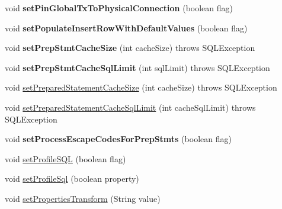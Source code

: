 \begin{DoxyCompactItemize}
void {\bfseries set\+Pin\+Global\+Tx\+To\+Physical\+Connection} (boolean flag)
\item 
\mbox{\label{classcom_1_1mysql_1_1jdbc_1_1jdbc2_1_1optional_1_1_connection_wrapper_abc9c76cd24f2cba013932390ad87d050}} 
void {\bfseries set\+Populate\+Insert\+Row\+With\+Default\+Values} (boolean flag)
\item 
\mbox{\label{classcom_1_1mysql_1_1jdbc_1_1jdbc2_1_1optional_1_1_connection_wrapper_aea615dcb590f8d76fca564b55a1f6409}} 
void {\bfseries set\+Prep\+Stmt\+Cache\+Size} (int cache\+Size)  throws S\+Q\+L\+Exception 
\item 
\mbox{\label{classcom_1_1mysql_1_1jdbc_1_1jdbc2_1_1optional_1_1_connection_wrapper_a28d309f7f48c2b637d3db0b37bd07d0d}} 
void {\bfseries set\+Prep\+Stmt\+Cache\+Sql\+Limit} (int sql\+Limit)  throws S\+Q\+L\+Exception 
\item 
void \mbox{\hyperlink{classcom_1_1mysql_1_1jdbc_1_1jdbc2_1_1optional_1_1_connection_wrapper_a5f678b0f5276621832a23fc1c9a31786}{set\+Prepared\+Statement\+Cache\+Size}} (int cache\+Size)  throws S\+Q\+L\+Exception 
\item 
void \mbox{\hyperlink{classcom_1_1mysql_1_1jdbc_1_1jdbc2_1_1optional_1_1_connection_wrapper_acdf5cc8f365225e264d7a667a13abcba}{set\+Prepared\+Statement\+Cache\+Sql\+Limit}} (int cache\+Sql\+Limit)  throws S\+Q\+L\+Exception 
\item 
\mbox{\label{classcom_1_1mysql_1_1jdbc_1_1jdbc2_1_1optional_1_1_connection_wrapper_ae7635d5518e5126834c20ebf0274dfad}} 
void {\bfseries set\+Process\+Escape\+Codes\+For\+Prep\+Stmts} (boolean flag)
\item 
void \mbox{\hyperlink{classcom_1_1mysql_1_1jdbc_1_1jdbc2_1_1optional_1_1_connection_wrapper_a930d83fb622c7a5e5ac1694599e7b696}{set\+Profile\+S\+QL}} (boolean flag)
\item 
void \mbox{\hyperlink{classcom_1_1mysql_1_1jdbc_1_1jdbc2_1_1optional_1_1_connection_wrapper_afe33bc3a8bc2ecba4e453c1bcb3d5d2d}{set\+Profile\+Sql}} (boolean property)
\item 
void \mbox{\hyperlink{classcom_1_1mysql_1_1jdbc_1_1jdbc2_1_1optional_1_1_connection_wrapper_a6c9f8bd8652930ab22706c7c3cf23471}{set\+Properties\+Transform}} (String value)

\end{DoxyCompactItemize}
